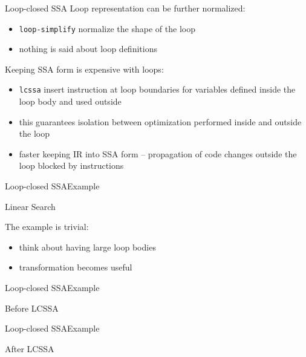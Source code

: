 \begin{frame}{Loop-closed SSA}
Loop representation can be further normalized:

\begin{itemize}
\item \texttt{loop-simplify} normalize the \alert{shape} of the loop
\item nothing is said about loop definitions
\end{itemize}

\vfill
Keeping SSA form is expensive with loops:

\begin{itemize}
\item \texttt{lcssa} insert  instruction at loop boundaries for
      variables \alert{defined inside} the loop body and \alert{used outside}
\item this guarantees isolation between optimization performed inside and outside
      the loop
\item faster keeping IR into SSA form -- propagation of code changes outside the
      loop blocked by  instructions
\end{itemize}
\end{frame}

\begin{frame}{Loop-closed SSA}{Example}
\begin{block}{Linear Search}
\centering
{}
\end{block}

\vfill
The example is trivial:

\begin{itemize}
\item think about having large loop bodies
\item transformation becomes useful
\end{itemize}
\end{frame}

\begin{frame}{Loop-closed SSA}{Example}
\begin{block}{Before LCSSA}
\centering
{}
\end{block}
\vspace{\baselineskip}
\vfill
\end{frame}

\begin{frame}{Loop-closed SSA}{Example}
\begin{block}{After LCSSA}
\centering
{}
\end{block}
\vfill
\end{frame}

